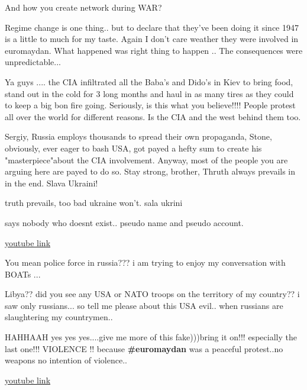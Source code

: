 \begin{itemize}
\begin{itemize}

And how you create network during WAR?


Regime change is one thing.. but to declare that they've been doing it since
1947 is a little to much for my taste. Again I don't care weather they were
involved in euromaydan. What happened was right thing to happen .. The
consequences were unpredictable...


Ya guys .... the CIA infiltrated all the Baba's and Dido's in Kiev to bring
food, stand out in the cold for 3 long months and haul in as many tires as they
could to keep a big bon fire going. Seriously, is this what you believe!!!!
People protest all over the world for different reasons. Is the CIA and the
west behind them too.


Sergiy, Russia employs thousands to spread their own propaganda, Stone,
obviously, ever eager to bash USA, got payed a hefty sum to create his
"masterpiece"about the CIA involvement. Anyway, most of the people you are
arguing here are payed to do so. Stay strong, brother, Thruth always prevails
in in the end. Slava Ukraini!

truth prevails, too bad ukraine won't. sala ukrini


says nobody who doesnt exist.. pseudo name and pseudo account.

\href{https://www.youtube.com/watch?v=u7Z0incwC2w}{youtube link}


You mean police force in russia??? i am trying to enjoy my conversation with BOATs ...


Libya?? did you see any USA or NATO troops on the territory of my country?? i
saw only russians... so tell me please about this USA evil.. when russians are
slaughtering my countrymen..


HAHHAAH yes yes yes....give me more of this fake)))bring it on!!! especially
the last one!!! VIOLENCE !! because \textbf{\#euromaydan} was a peaceful protest..no
weapons no intention of violence..

\href{https://www.youtube.com/watch?v=RJR1wz7muFI}{youtube link}


\end{itemize}
\end{itemize}
